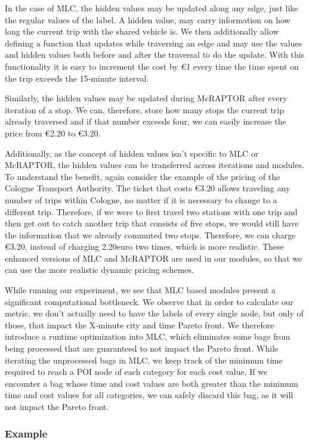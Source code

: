 In the case of MLC, the hidden values may be updated along any edge, just like the regular values of the label.
A hidden value, may carry information on how long the current trip with the shared vehicle is.
We then additionally allow defining a function that updates while traversing an edge and may use the values and hidden values both before and after the traversal to do the update.
With this functionality it is easy to increment the cost by \euro{1} every time the time spent on the trip exceeds the 15-minute interval.

Similarly, the hidden values may be updated during McRAPTOR after every iteration of a stop.
We can, therefore, store how many stops the current trip already traversed and if that number exceeds four, we can easily increase the price from \euro{2.20} to \euro{3.20}.

Additionally, as the concept of hidden values isn't specific to MLC or McRAPTOR, the hidden values can be transferred across iterations and modules.
To understand the benefit, again consider the example of the pricing of the Cologne Transport Authority.
The ticket that costs \euro{3.20} allows traveling any number of trips within Cologne, no matter if it is necessary to change to a different trip.
Therefore, if we were to first travel two stations with one trip and then get out to catch another trip that consists of five stops, we would still have the information that we already commuted two stops.
Therefore, we can charge \euro{3.20}, instead of charging 2.20euro two times, which is more realistic.
These enhanced versions of MLC and McRAPTOR are used in our modules, so that we can use the more realistic dynamic pricing schemes.

While running our experiment, we see that MLC based modules present a significant computational bottleneck.
We observe that in order to calculate our metric, we don't actually need to have the labels of every single node, but only of those, that impact the X-minute city and time Pareto front.
We therefore introduce a runtime optimization into MLC, which eliminates some bags from being processed that are guaranteed to not impact the Pareto front.
While iterating the unprocessed bags in MLC, we keep track of the minimum time required to reach a POI node of each category for each cost value.
If we encounter a bag whose time and cost values are both greater than the minimum time and cost values for all categories, we can safely discard this bag, as it will not impact the Pareto front.


\subsubsection{Example}
\label{subsubsec:example}

